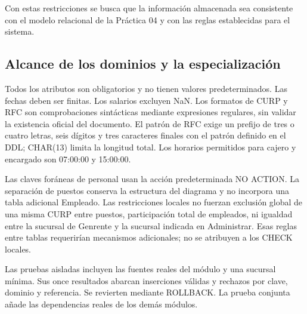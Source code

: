 Con estas restricciones se busca que la información almacenada sea consistente con el modelo relacional de la Práctica 04 y con las reglas establecidas para el sistema.


\subsection{Alcance de los dominios y la especialización}
Todos los atributos son obligatorios y no tienen valores predeterminados.
Las fechas deben ser finitas. Los salarios excluyen NaN. Los formatos de CURP
y RFC son comprobaciones sintácticas mediante expresiones regulares, sin validar
la existencia oficial del documento. El patrón de RFC exige un prefijo de tres o
cuatro letras, seis dígitos y tres caracteres finales con el patrón definido en
el DDL; CHAR(13) limita la longitud total. Los horarios permitidos para cajero y
encargado son 07:00:00 y 15:00:00.

Las claves foráneas de personal usan la acción predeterminada NO ACTION. La
separación de puestos conserva la estructura del diagrama y no incorpora una
tabla adicional Empleado. Las restricciones locales no fuerzan exclusión global
de una misma CURP entre puestos, participación total de empleados, ni igualdad
entre la sucursal de Genrente y la sucursal indicada en Administrar. Esas reglas
entre tablas requerirían mecanismos adicionales; no se atribuyen a los CHECK
locales.

Las pruebas aisladas incluyen las fuentes reales del módulo y una sucursal
mínima. Sus once resultados abarcan inserciones válidas y rechazos por clave,
dominio y referencia. Se revierten mediante ROLLBACK. La prueba conjunta añade
las dependencias reales de los demás módulos.
